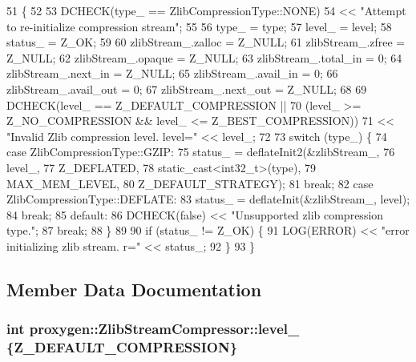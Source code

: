 \begin{DoxyCode}
51                                                                        \{
52 
53   DCHECK(type_ == ZlibCompressionType::NONE)
54       << \textcolor{stringliteral}{"Attempt to re-initialize compression stream"};
55 
56   type_ = type;
57   level_ = level;
58   status_ = Z\_OK;
59 
60   zlibStream_.zalloc = Z\_NULL;
61   zlibStream_.zfree = Z\_NULL;
62   zlibStream_.opaque = Z\_NULL;
63   zlibStream_.total\_in = 0;
64   zlibStream_.next\_in = Z\_NULL;
65   zlibStream_.avail\_in = 0;
66   zlibStream_.avail\_out = 0;
67   zlibStream_.next\_out = Z\_NULL;
68 
69   DCHECK(level_ == Z\_DEFAULT\_COMPRESSION ||
70          (level_ >= Z\_NO\_COMPRESSION && level_ <= Z\_BEST\_COMPRESSION))
71       << \textcolor{stringliteral}{"Invalid Zlib compression level. level="} << level_;
72 
73   \textcolor{keywordflow}{switch} (type_) \{
74   \textcolor{keywordflow}{case} ZlibCompressionType::GZIP:
75     status_ = deflateInit2(&zlibStream_,
76                            level_,
77                            Z\_DEFLATED,
78                            static\_cast<int32\_t>(type),
79                            MAX\_MEM\_LEVEL,
80                            Z\_DEFAULT\_STRATEGY);
81     \textcolor{keywordflow}{break};
82   \textcolor{keywordflow}{case} ZlibCompressionType::DEFLATE:
83     status_ = deflateInit(&zlibStream_, level);
84     \textcolor{keywordflow}{break};
85   \textcolor{keywordflow}{default}:
86     DCHECK(\textcolor{keyword}{false}) << \textcolor{stringliteral}{"Unsupported zlib compression type."};
87     \textcolor{keywordflow}{break};
88   \}
89 
90   \textcolor{keywordflow}{if} (status_ != Z\_OK) \{
91     LOG(ERROR) << \textcolor{stringliteral}{"error initializing zlib stream. r="} << status_;
92   \}
93 \}
\end{DoxyCode}


\subsection{Member Data Documentation}
\subsubsection[{level\+\_\+}]{\setlength{\rightskip}{0pt plus 5cm}int proxygen\+::\+Zlib\+Stream\+Compressor\+::level\+\_\+ \{Z\+\_\+\+D\+E\+F\+A\+U\+L\+T\+\_\+\+C\+O\+M\+P\+R\+E\+S\+S\+I\+ON\}\hspace{0.3cm}{\ttfamily [private]}}\label{classproxygen_1_1ZlibStreamCompressor_a7cd77aca8f3ac4252ee652bb5206196a}


